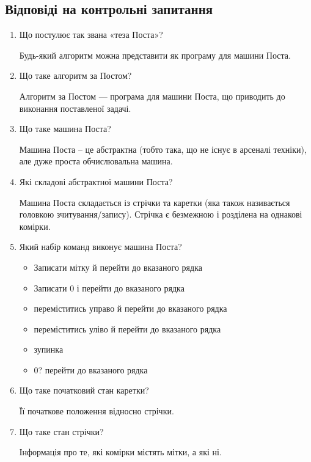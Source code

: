 \documentclass[a4paper, 12pt, oneside]{extarticle}
\begin{document}
\subsection*{Відповіді на контрольні запитання}
\begin{enumerate}
	\item	Що постулює так звана «теза Поста»?

		Будь-який алгоритм можна представити як програму для машини Поста.

	\item	Що таке алгоритм за Постом?

		Алгоритм за Постом --- програма для машини Поста, що приводить до виконання
		поставленої задачі.

	\item	Що таке машина Поста?

	Машина Поста – це абстрактна (тобто така, що не існує в арсеналі
	техніки), але дуже проста обчислювальна машина.

	\item	Які складові абстрактної машини Поста?

Машина Поста складається із стрічки та каретки (яка також
називається головкою зчитування/запису). Стрічка є безмежною і розділена
на однакові комірки.

	\item	Який набір команд виконує машина Поста?

		\begin{itemize}

	\item	Записати мітку й перейти до вказаного рядка
	\item	Записати 0 і перейти до вказаного рядка
	\item	переміститись управо й перейти до вказаного рядка
	\item	переміститись уліво й перейти до вказаного рядка
	\item	зупинка
	\item	0? перейти до вказаного рядка

		\end{itemize}

	\item	Що таке початковий стан каретки?

		Її початкове положення відносно стрічки.

	\item	Що таке стан стрічки?

		Інформація про те, які комірки містять мітки, а які ні.


\end{enumerate}
\end{document}
